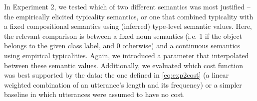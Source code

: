 \documentclass[11pt]{article}
\begin{document}
In Experiment 2, we tested which of two different semantics was most justified -- the empirically elicited typicality semantics, or one that combined typicality with a fixed compositional semantics using (inferred) type-level semantic values. 
Here, the relevant comparison is between a fixed noun semantics (i.e. 1 if the object belongs to the given class label, and 0 otherwise) and a continuous semantics using empirical typicalities. 
Again, we introduced a parameter that interpolated between these semantic values. 
Additionally, we evaluated which cost function was best supported by the data: the one defined in \eqref{eq:exp2cost} (a linear weighted combination of an utterance's length and its frequency) or a simpler baseline in which utterances were assumed to have no cost.

\end{document}
